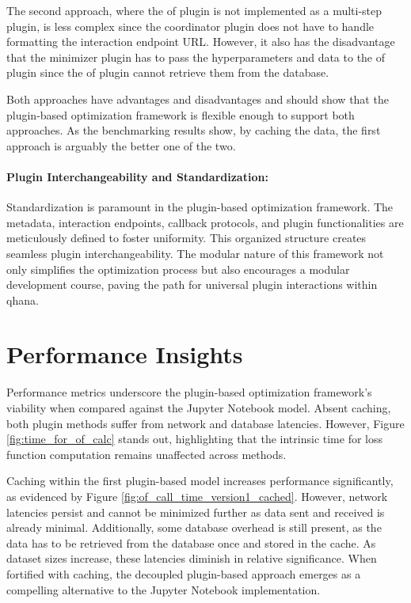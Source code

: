 \documentclass[
  a4paper,  %
  twoside,  %
  bibliography=totoc,
  headsepline,
  cleardoublepage=empty,
  parskip=half,
  draft=false
]{scrbook}
\begin{document}
The second approach, where the \gls{of} plugin is not implemented as a multi-step plugin, is less complex since the coordinator plugin does not have to handle formatting the interaction endpoint URL.
However, it also has the disadvantage that the minimizer plugin has to pass the hyperparameters and data to the \gls{of} plugin since the \gls{of} plugin cannot retrieve them from the database.

Both approaches have advantages and disadvantages and should show that the plugin-based optimization framework is flexible enough to support both approaches.
As the benchmarking results show, by caching the data, the first approach is arguably the better one of the two.


\paragraph{Plugin Interchangeability and Standardization:}
\label{sec:interchangeabilityAndStandardization}

Standardization is paramount in the plugin-based optimization framework.
The metadata, interaction endpoints, callback protocols, and plugin functionalities are meticulously defined to foster uniformity.
This organized structure creates seamless plugin interchangeability.
The modular nature of this framework not only simplifies the optimization process but also encourages a modular development course, paving the path for universal plugin interactions within \gls{qhana}.

\section{Performance Insights}
\label{sec:performanceAnalysis}

Performance metrics underscore the plugin-based optimization framework's viability when compared against the Jupyter Notebook model.
Absent caching, both plugin methods suffer from network and database latencies.
However, Figure \ref{fig:time_for_of_calc} stands out, highlighting that the intrinsic time for loss function computation remains unaffected across methods.

Caching within the first plugin-based model increases performance significantly, as evidenced by Figure \ref{fig:of_call_time_version1_cached}.
However, network latencies persist and cannot be minimized further as data sent and received is already minimal.
Additionally, some database overhead is still present, as the data has to be retrieved from the database once and stored in the cache.
As dataset sizes increase, these latencies diminish in relative significance.
When fortified with caching, the decoupled plugin-based approach emerges as a compelling alternative to the Jupyter Notebook implementation.
\end{document}
